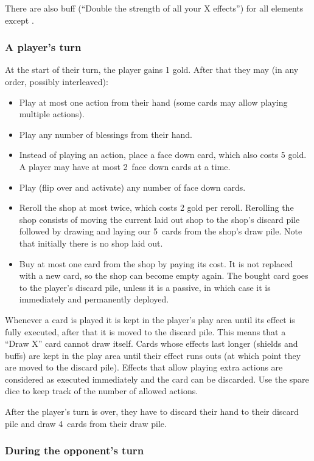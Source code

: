 \documentclass[dvipsnames,parskip,a4paper]{scrartcl}
\newcommand{\iconsize}{3.4mm}
\newcommand{\icondepth}{0.45mm}
\newcommand{\icon}[1]{\raisebox{-\icondepth}{\texttt{[image:  \#1 ]}}}
\newcommand{\chance}{\icon{icons/chance.png}}
\newcommand{\handsize}{4}
\newcommand{\dacedownsize}{2}
\newcommand{\shopsize}{5}
\begin{document}
There are also buff (``Double the strength of all your X effects'') for all elements except \chance.

\subsubsection*{A player's turn}

At the start of their turn, the player gains 1 gold. After that they may (in any order, possibly interleaved):

\begin{itemize}
\item Play at most one action from their hand (some cards may allow playing multiple actions).
\item Play any number of blessings from their hand.
\item Instead of playing an action, place a face down card, which also costs 5 gold. A player may have at most \dacedownsize \ face down cards at a time.
\item Play (flip over and activate) any number of face down cards.
\item Reroll the shop at most twice, which costs 2 gold per reroll.
Rerolling the shop consists of moving the current laid out shop to the shop's discard pile followed by drawing and laying our \shopsize \ cards from the shop's draw pile. Note that initially there is no shop laid out.
\item Buy at most one card from the shop by paying its cost. It is not replaced with a new card, so the shop can become empty again. The bought card goes to the player's discard pile, unless it is a passive, in which case it is immediately and permanently deployed.
\end{itemize}

Whenever a card is played it is kept in the player's play area until its effect is fully executed, after that it is moved to the discard pile. This means that a ``Draw X'' card cannot draw itself. Cards whose effects last longer (shields and buffs) are kept in the play area until their effect runs outs (at which point they are moved to the discard pile). Effects that allow playing extra actions are considered as executed immediately and the card can be discarded. Use the spare dice to keep track of the number of allowed actions.

After the player's turn is over, they have to discard their hand to their discard pile and draw \handsize \ cards from their draw pile. 

\subsubsection*{During the opponent's turn}
\end{document}
